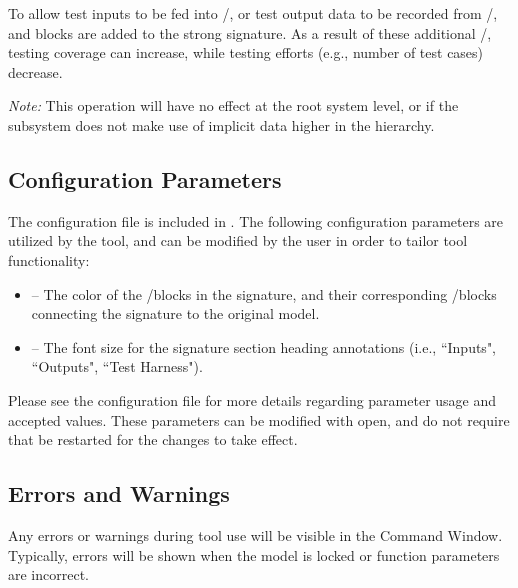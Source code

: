 \documentclass{article}
\newcommand{\toolFolder}{\cmd{Signature}}
\begin{document}
To allow test inputs to be fed into /, or test output data to be recorded from /, \inport and \outport blocks are added to the strong signature. As a result of these additional /, testing coverage can increase, while testing efforts (e.g., number of test cases) decrease.

\emph{Note:} This operation will have no effect at the root system level, or if the subsystem does not make use of implicit data higher in the hierarchy.

\subsection{Configuration Parameters}
The configuration file  is included in \cmd{\toolFolder\textbackslash src}. The following configuration parameters are utilized by the tool, and can be modified by the user in order to tailor tool functionality:

\begin{itemize}
	\item {} -- The color of the \goto/\from blocks in the signature, and their corresponding \goto/\from blocks connecting the signature to the original model. 
	\item {} -- The font size for the signature section heading annotations (i.e., ``Inputs", ``Outputs", ``Test Harness").
\end{itemize}

Please see the configuration file for more details regarding parameter usage and accepted values. These parameters can be modified with \matlab open, and do not require that \matlab be restarted for the changes to take effect.

\subsection{Errors and Warnings}
Any errors or warnings during tool use will be visible in the \matlab Command Window. Typically, errors will be shown when the model is locked or function parameters are incorrect.

\end{document}

